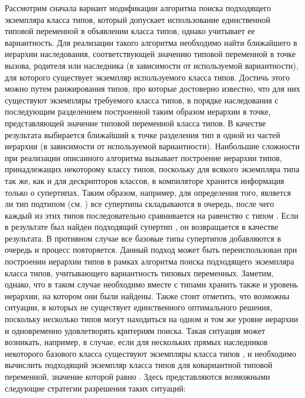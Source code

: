 Рассмотрим сначала вариант модификации алгоритма поиска подходящего экземпляра класса типов, который допускает использование единственной типовой переменной в объявлении класса типов, однако учитывает ее вариантность. Для реализации такого алгоритма необходимо найти ближайшего в иерархии наследования, соответствующей значению типовой переменной в точке вызова, родителя или наследника (в зависимости от используемой вариантности), для которого существует экземпляр используемого класса типов. Достичь этого можно путем ранжирования типов, про которые достоверно известно, что для них существуют экземпляры требуемого класса типов, в порядке наследования с последующим разделением построенной таким образом иерархии в точке, представляющей значение типовой переменной класса типов. В качестве результата выбирается ближайший к точке разделения тип в одной из частей иерархии (в зависимости от используемой вариантности). Наибольшие сложности при реализации описанного алгоритма вызывает построение иерархии типов, принадлежащих некоторому классу типов, поскольку для всякого экземпляра типа так же, как и для дескрипторов классов, в компиляторе хранится информация только о супертипах. Таким образом, например, для определения того, является ли тип  подтипом  (см. ) все супертипы  складываются в очередь, после чего каждый из этих типов последовательно сравнивается на равенство с типом . Если в результате был найден подходящий супертип , он возвращается в качестве результата. В противном случае все базовые типы супертипов  добавляются в очередь и процесс повторяется. Данный подход может быть переиспользован при построении иерархии типов в рамках алгоритма поиска подходящего экземпляра класса типов, учитывающего вариантность типовых переменных. Заметим, однако, что в таком случае необходимо вместе с типами хранить также и уровень иерархии, на котором они были найдены. Также стоит отметить, что возможны ситуации, в которых не существует единственного оптимального решения, поскольку несколько типов могут находиться на одном и том же уровне иерархии и одновременно удовлетворять критериям поиска. Такая ситуация может возникать, например, в случае, если для нескольких прямых наследников некоторого базового класса  существуют экземпляры класса типов , и необходимо вычислить подходящий экземпляр класса типов  для ковариантной типовой переменной, значение которой равно . Здесь представляются возможными следующие стратегии разрешения таких ситуаций:
